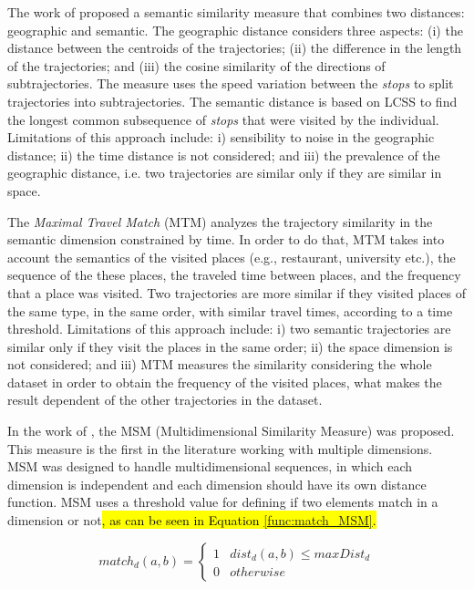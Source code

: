The work of \cite{Liu:2012:SMM:2442968.2442971} proposed a semantic similarity measure that combines two distances: geographic and semantic. The geographic distance considers three aspects: (i) the distance between the centroids of the trajectories; (ii) the difference in the length of the trajectories; and (iii) the cosine similarity of the directions of subtrajectories. The measure uses the speed variation between the \emph{stops} to split trajectories into subtrajectories. The semantic distance is based on LCSS to find the longest common subsequence of \emph{stops} that were visited by the individual. Limitations of this approach include: i) sensibility to noise in the geographic distance; ii) the time distance is not considered; and iii) the prevalence of the geographic distance, i.e. two trajectories are similar only if they are similar in space.

The \emph{Maximal Travel Match} (MTM)\cite{Xiao:2010:FSU:1869790.1869857} analyzes the trajectory similarity in the semantic dimension constrained by time. In order to do that, MTM takes into account the semantics of the visited places (e.g., restaurant, university etc.), the sequence of the these places, the traveled time between places, and the frequency that a place was visited. Two trajectories are more similar if they visited places of the same type, in the same order, with similar travel times, according to a time threshold. Limitations of this approach include: i) two semantic trajectories are similar only if they visit the places in the same order; ii) the space dimension is not considered; and iii) MTM measures the similarity considering the whole dataset in order to obtain the frequency of the visited places, what makes the result dependent of the other trajectories in the dataset.

In the work of \cite{Furtado:TGIS12156}, the MSM (Multidimensional Similarity Measure) was proposed. This measure is the first in the literature working with multiple dimensions. MSM was designed to handle multidimensional sequences, in which each dimension is independent and each dimension should have its own distance function. 
MSM uses a threshold value for defining if two elements match in a dimension or not\hl{, as can be seen in Equation {\ref{func:match_MSM}}.}

\begin{equation}
\label{func:match_MSM}
  match_d(a, b) = 
  \begin{cases} 
      1 & dist_d(a, b) \leq maxDist_d \\
      0 & otherwise
  \end{cases}
\end{equation}

